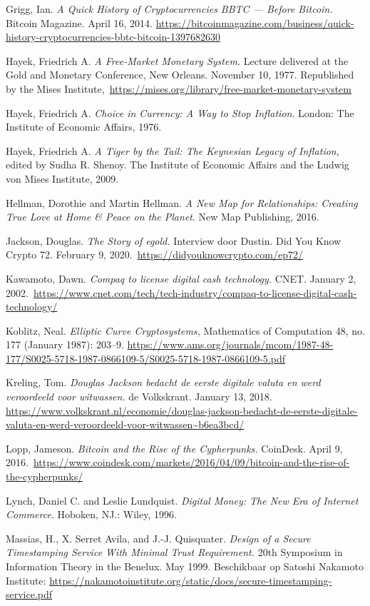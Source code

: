 \documentclass[
  a5paper,
  smalldemyvopaper,11pt,twoside,onecolumn,openright,extrafontsizes,
hidelinks]{memoir}
\begin{document}
Grigg, Ian. \emph{A Quick History of Cryptocurrencies BBTC --- Before
Bitcoin.} Bitcoin Magazine. April 16, 2014.
\url{https://bitcoinmagazine.com/business/quick-history-cryptocurrencies-bbtc-bitcoin-1397682630}

Hayek, Friedrich A. \emph{A Free-Market Monetary System.} Lecture
delivered at the Gold and Monetary Conference, New Orleans. November 10,
1977. Republished by the Mises
Institute,~\url{https://mises.org/library/free-market-monetary-system}

Hayek, Friedrich A. \emph{Choice in Currency: A Way to Stop Inflation}.
London: The Institute of Economic Affairs, 1976.

Hayek, Friedrich A. \emph{A Tiger by the Tail: The Keynesian Legacy of
Inflation}, edited by Sudha R. Shenoy. The Institute of Economic Affairs
and the Ludwig von Mises Institute, 2009.

Hellman, Dorothie and Martin Hellman. \emph{A New Map for Relationships:
Creating True Love at Home \& Peace on the Planet}. New Map Publishing,
2016.

Jackson, Douglas. \emph{The Story of egold.} Interview door Dustin. Did
You Know Crypto 72. February 9,
2020.~\url{https://didyouknowcrypto.com/ep72/}

Kawamoto, Dawn. \emph{Compaq to license digital cash technology.} CNET.
January 2,
2002.~\url{https://www.cnet.com/tech/tech-industry/compaq-to-license-digital-cash-technology/}

Koblitz, Neal. \emph{Elliptic Curve Cryptosystems,} Mathematics of
Computation 48, no. 177 (January 1987): 203--9.
\url{https://www.ams.org/journals/mcom/1987-48-177/S0025-5718-1987-0866109-5/S0025-5718-1987-0866109-5.pdf}

Kreling, Tom. \emph{Douglas Jackson bedacht de eerste digitale valuta en
werd veroordeeld voor witwassen.} de Volkskrant. January 13, 2018.
\url{https://www.volkskrant.nl/economie/douglas-jackson-bedacht-de-eerste-digitale-valuta-en-werd-veroordeeld-voor-witwassen~b6ea3bcd/}

Lopp, Jameson. \emph{Bitcoin and the Rise of the Cypherpunks.} CoinDesk.
April 9,
2016.~\url{https://www.coindesk.com/markets/2016/04/09/bitcoin-and-the-rise-of-the-cypherpunks/}

Lynch, Daniel C. and Leslie Lundquist. \emph{Digital Money: The New Era
of Internet Commerce}. Hoboken, NJ.: Wiley, 1996.

Massias, H., X. Serret Avila, and J.-J. Quisquater. \emph{Design of a
Secure Timestamping Service With Minimal Trust Requirement.} 20th
Symposium in Information Theory in the Benelux. May 1999. Beschikbaar op
Satoshi Nakamoto Institute:
\url{https://nakamotoinstitute.org/static/docs/secure-timestamping-service.pdf}
\end{document}
